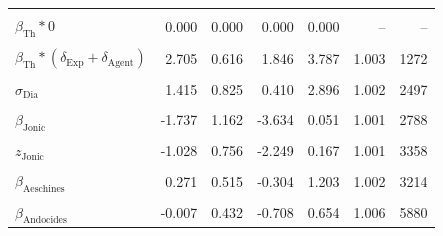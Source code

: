\begin{longtable}{lrrrrrr}
\cellcolor{gray!10}{$\delta_{\text{Agent}}$} & \cellcolor{gray!10}{0.578} & \cellcolor{gray!10}{0.120} & \cellcolor{gray!10}{0.387} & \cellcolor{gray!10}{0.768} & \cellcolor{gray!10}{1.001} & \cellcolor{gray!10}{4462}\\
$\beta_{\text{Th}} * 0$ & 0.000 & 0.000 & 0.000 & 0.000 & -- & --\\
\cellcolor{gray!10}{$\beta_{\text{Th}} * \delta_{\text{Exp}}$} & \cellcolor{gray!10}{1.149} & \cellcolor{gray!10}{0.438} & \cellcolor{gray!10}{0.522} & \cellcolor{gray!10}{1.881} & \cellcolor{gray!10}{1.001} & \cellcolor{gray!10}{1875}\\
$\beta_{\text{Th}} * (\delta_{\text{Exp}} + \delta_{\text{Agent}})$ & 2.705 & 0.616 & 1.846 & 3.787 & 1.003 & 1272\\
\cellcolor{gray!10}{$\overline{\beta}_{\text{Dia}}$} & \cellcolor{gray!10}{-0.356} & \cellcolor{gray!10}{0.836} & \cellcolor{gray!10}{-1.687} & \cellcolor{gray!10}{0.989} & \cellcolor{gray!10}{1.001} & \cellcolor{gray!10}{4247}\\
$\sigma_{\text{Dia}}$ & 1.415 & 0.825 & 0.410 & 2.896 & 1.002 & 2497\\
\cellcolor{gray!10}{$\beta_{\text{Attic}}$} & \cellcolor{gray!10}{0.194} & \cellcolor{gray!10}{0.897} & \cellcolor{gray!10}{-1.239} & \cellcolor{gray!10}{1.607} & \cellcolor{gray!10}{1.001} & \cellcolor{gray!10}{4047}\\
$\beta_{\text{Jonic}}$ & -1.737 & 1.162 & -3.634 & 0.051 & 1.001 & 2788\\
\cellcolor{gray!10}{$z_{\text{Attic}}$} & \cellcolor{gray!10}{0.522} & \cellcolor{gray!10}{0.731} & \cellcolor{gray!10}{-0.552} & \cellcolor{gray!10}{1.764} & \cellcolor{gray!10}{1.000} & \cellcolor{gray!10}{3310}\\
$z_{\text{Jonic}}$ & -1.028 & 0.756 & -2.249 & 0.167 & 1.001 & 3358\\
\cellcolor{gray!10}{$\sigma_{\text{Auth}}$} & \cellcolor{gray!10}{0.444} & \cellcolor{gray!10}{0.326} & \cellcolor{gray!10}{0.044} & \cellcolor{gray!10}{1.048} & \cellcolor{gray!10}{1.009} & \cellcolor{gray!10}{959}\\
$\beta_{\text{Aeschines}}$ & 0.271 & 0.515 & -0.304 & 1.203 & 1.002 & 3214\\
\cellcolor{gray!10}{$\beta_{\text{Aeschylus}}$} & \cellcolor{gray!10}{-0.156} & \cellcolor{gray!10}{0.556} & \cellcolor{gray!10}{-1.152} & \cellcolor{gray!10}{0.564} & \cellcolor{gray!10}{1.004} & \cellcolor{gray!10}{4090}\\
$\beta_{\text{Andocides}}$ & -0.007 & 0.432 & -0.708 & 0.654 & 1.006 & 5880\\

\end{longtable}
